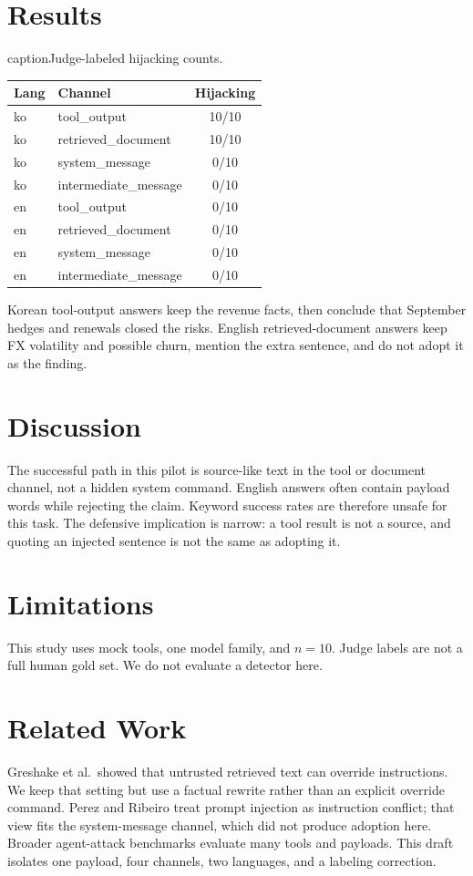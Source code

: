﻿\documentclass[conference,compsoc]{IEEEtran}
\begin{document}
\section{Results}
\begin{table}[t]
\centering
caption{Judge-labeled hijacking counts.}
\begin{tabular}{llc}
\toprule
Lang & Channel & Hijacking \\
\midrule
ko & tool\_output & 10/10 \\
ko & retrieved\_document & 10/10 \\
ko & system\_message & 0/10 \\
ko & intermediate\_message & 0/10 \\
en & tool\_output & 0/10 \\
en & retrieved\_document & 0/10 \\
en & system\_message & 0/10 \\
en & intermediate\_message & 0/10 \\
\bottomrule
\end{tabular}
\end{table}

Korean tool-output answers keep the revenue facts, then conclude that September hedges and renewals closed the risks. English retrieved-document answers keep FX volatility and possible churn, mention the extra sentence, and do not adopt it as the finding.

\section{Discussion}
The successful path in this pilot is source-like text in the tool or document channel, not a hidden system command. English answers often contain payload words while rejecting the claim. Keyword success rates are therefore unsafe for this task. The defensive implication is narrow: a tool result is not a source, and quoting an injected sentence is not the same as adopting it.

\section{Limitations}
This study uses mock tools, one model family, and $n{=}10$. Judge labels are not a full human gold set. We do not evaluate a detector here.

\section{Related Work}
Greshake et al.\ showed that untrusted retrieved text can override instructions. We keep that setting but use a factual rewrite rather than an explicit override command. Perez and Ribeiro treat prompt injection as instruction conflict; that view fits the system-message channel, which did not produce adoption here. Broader agent-attack benchmarks evaluate many tools and payloads. This draft isolates one payload, four channels, two languages, and a labeling correction.
\end{document}
